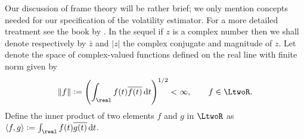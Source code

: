 \documentclass[a4paper, 12pt]{article}
\renewcommand{\D}{\ensuremath{\dif}\xspace}
\begin{document}
Our discussion of  frame theory will be  rather brief; we only mention concepts needed for our specification of the volatility estimator.  For a  more detailed treatment see the book by \cite{Christensen2008}. 
In the sequel if $z$ is a complex number then we shall denote respectively by $\bar{z}$ and $\vert z \vert$ the complex conjugate and magnitude of $z$. Let \LtwoR denote the space of complex-valued functions defined on the real line with finite norm given by 
\begin{align}
  \Vert f \Vert := \left(\int_\real f(t) \overline{f(t)} \D t\right)^{1/2} < \infty, \qquad  f \in \LtwoR.\notag
  \label{}
\end{align}
 Define the  inner product of two elements $f$ and $g$ in $\LtwoR$ as $\langle f,g\rangle :=  \int_\real f(t) \overline{g(t)} \D t$.
\end{document}
